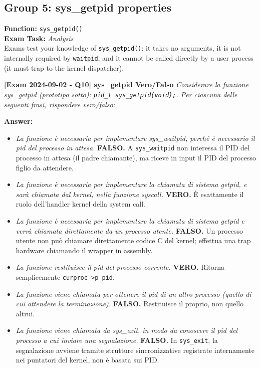 \newpage
\subsection*{Group 5: sys\_getpid properties}

\begin{tcolorbox}[colback=red!5!white, colframe=red!75!black, title=\textbf{! EXAM FOCUS: IMPLEMENTATION REQUIRED}]
\textbf{Function:} \texttt{sys\_getpid()} \\
\textbf{Exam Task:} \textit{Analysis} \\
Exams test your knowledge of \texttt{sys\_getpid()}: it takes no arguments, it is not internally required by \texttt{waitpid}, and it cannot be called directly by a user process (it must trap to the kernel dispatcher).
\end{tcolorbox}


\textbf{[Exam 2024-09-02 - Q10] sys\_getpid Vero/Falso}
\textit{Considerare la funzione sys\_getpid (prototipo sotto): \texttt{pid\_t sys\_getpid(void);}. Per ciascuna delle seguenti frasi, rispondere vero/falso:}

\textbf{Answer:}
\begin{itemize}
    \item \textit{La funzione è necessaria per implementare sys\_waitpid, perché è necessario il pid del processo in attesa.} \textbf{FALSO.} A \texttt{sys\_waitpid} non interessa il PID del processo in attesa (il padre chiamante), ma riceve in input il PID del processo figlio da attendere.
    \item \textit{La funzione è necessaria per implementare la chiamata di sistema getpid, e sarà chiamata dal kernel, nella funzione syscall.} \textbf{VERO.} È esattamente il ruolo dell'handler kernel della system call.
    \item \textit{La funzione è necessaria per implementare la chiamata di sistema getpid e verrà chiamata direttamente da un processo utente.} \textbf{FALSO.} Un processo utente non può chiamare direttamente codice C del kernel; effettua una trap hardware chiamando il wrapper in assembly.
    \item \textit{La funzione restituisce il pid del processo corrente.} \textbf{VERO.} Ritorna semplicemente \texttt{curproc->p\_pid}.
    \item \textit{La funzione viene chiamata per ottenere il pid di un altro processo (quello di cui attendere la terminazione).} \textbf{FALSO.} Restituisce il proprio, non quello altrui.
    \item \textit{La funzione viene chiamata da sys\_exit, in modo da conoscere il pid del processo a cui inviare una segnalazione.} \textbf{FALSO.} In \texttt{sys\_exit}, la segnalazione avviene tramite strutture sincronizzative registrate internamente nei puntatori del kernel, non è basata sui PID.
\end{itemize}


